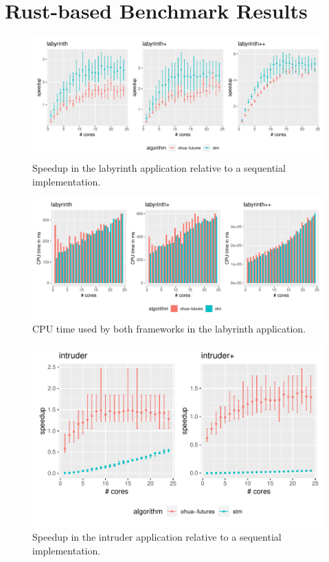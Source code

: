 \section{Rust-based Benchmark Results}

\begin{figure}
    \centering
    \includegraphics[width=\textwidth,keepaspectratio]{gfx/results/labyrinth_comb}
    \caption{Speedup in the labyrinth application relative to a sequential implementation.}%
    \label{fig:evaluation:labyrinth}
\end{figure}

\begin{figure}
    \centering
    \includegraphics[width=\textwidth,keepaspectratio]{gfx/results/cpu_labyrinth_comb}
    \caption{CPU time used by both frameworks in the labyrinth application.}%
    \label{fig:evaluation:labyrinth-cpu}
\end{figure}

\begin{figure}
    \centering
    \includegraphics[width=.66\textwidth,keepaspectratio]{gfx/results/intruder_comb}
    \caption{Speedup in the intruder application relative to a sequential implementation.}%
    \label{fig:evaluation:intruder}
\end{figure}

